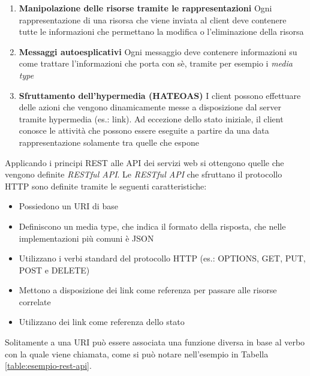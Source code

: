 \begin{itemize}
\begin{enumerate}
		\item \textbf{Manipolazione delle risorse tramite le rappresentazioni} Ogni rappresentazione di una risorsa che viene inviata al client deve contenere tutte le informazioni che permettano la modifica o l'eliminazione della risorsa
		\item \textbf{Messaggi autoesplicativi} Ogni messaggio deve contenere informazioni su come trattare l'informazioni che porta con sè, tramite per esempio i \emph{media type}
		\item \textbf{Sfruttamento dell'hypermedia (HATEOAS)} I client possono effettuare delle azioni che vengono dinamicamente messe a disposizione dal server tramite hypermedia (es.: link). Ad eccezione dello stato iniziale, il client conosce le attività che possono essere eseguite a partire da una data rappresentazione solamente tra quelle che espone
	\end{enumerate}
\end{itemize}

Applicando i principi REST alle API dei servizi web si ottengono quelle che vengono definite \emph{RESTful API}. Le \emph{RESTful API} che sfruttano il protocollo HTTP sono definite tramite le seguenti caratteristiche:

\begin{itemize}
	\item Possiedono un URI di base
	\item Definiscono un media type, che indica il formato della risposta, che nelle implementazioni più comuni è JSON
	\item Utilizzano i verbi standard del protocollo HTTP (es.: OPTIONS, GET, PUT, POST e DELETE)
	\item Mettono a disposizione dei link come referenza per passare alle risorse correlate
	\item Utilizzano dei link come referenza dello stato
\end{itemize}

Solitamente a una URI può essere associata una funzione diversa in base al verbo con la quale viene chiamata, come si può notare nell'esempio in Tabella \ref{table:esempio-rest-api}.

